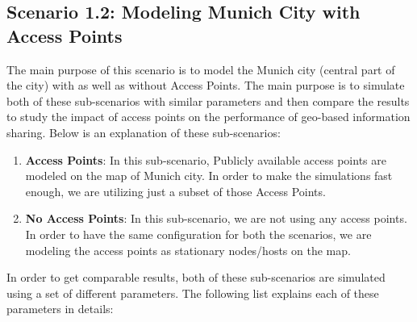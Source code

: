 \subsection{Scenario 1.2: Modeling Munich City with Access Points}
The main purpose of this scenario is to model the Munich city (central part of the city) with as well as without Access Points. The main purpose is to simulate both of these sub-scenarios with similar parameters and then compare the results to study the impact of access points on the performance of geo-based information sharing. Below is an explanation of these sub-scenarios:
\begin{enumerate}
	\item \textbf{Access Points}: In this sub-scenario, Publicly available access points are modeled on the map of Munich city. In order to make the simulations fast enough, we are utilizing just a subset of those Access Points.
	\item \textbf{No Access Points}: In this sub-scenario, we are not using any access points. In order to have the same configuration for both the scenarios, we are modeling the access points as stationary nodes/hosts on the map.
\end{enumerate}
\vspace{1mm}
In order to get comparable results, both of these sub-scenarios are simulated using a set of different parameters. The following list explains each of these parameters in details:

